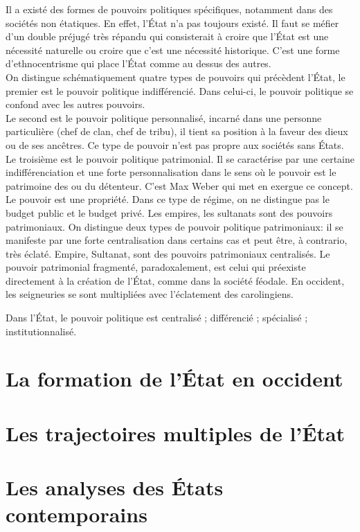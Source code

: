 \documentclass[10pt, a4paper, openany]{book}
\begin{document}
Il a existé des formes de pouvoirs politiques spécifiques, notamment dans des sociétés non étatiques. En effet, l'État n'a pas toujours existé. Il faut se méfier d'un double préjugé très répandu qui consisterait à croire que l'État est une nécessité naturelle ou croire que c'est une nécessité historique. C'est une forme d'ethnocentrisme qui place l'État comme au dessus des autres. \\
On distingue schématiquement quatre types de pouvoirs qui précèdent l'État, le premier est le pouvoir politique indifférencié. Dans celui-ci, le pouvoir politique se confond avec les autres pouvoirs. \\
Le second est le pouvoir politique personnalisé, incarné dans une personne particulière (chef de clan, chef de tribu), il tient sa position à la faveur des dieux ou de ses ancêtres. Ce type de pouvoir n'est pas propre aux sociétés sans États. \\
Le troisième est le pouvoir politique patrimonial. Il se caractérise par une certaine indifférenciation et une forte personnalisation dans le sens où le pouvoir est le patrimoine des ou du détenteur. C'est Max Weber qui met en exergue ce concept. Le pouvoir est une propriété. Dans ce type de régime, on ne distingue pas le budget public et le budget privé. Les empires, les sultanats sont des pouvoirs patrimoniaux. On distingue deux types de pouvoir politique patrimoniaux: il se manifeste par une forte centralisation dans certains cas et peut être, à contrario, très éclaté. Empire, Sultanat, sont des pouvoirs patrimoniaux centralisés. Le pouvoir patrimonial fragmenté, paradoxalement, est celui qui préexiste directement à la création de l'État, comme dans la société féodale. En occident, les seigneuries se sont multipliées avec l'éclatement des carolingiens. 


Dans l'État, le pouvoir politique est centralisé ; différencié ; spécialisé ; institutionnalisé. 



\chapter{La formation de l'État en occident}




\chapter{Les trajectoires multiples de l'État}




\chapter{Les analyses des États contemporains}
\end{document}
